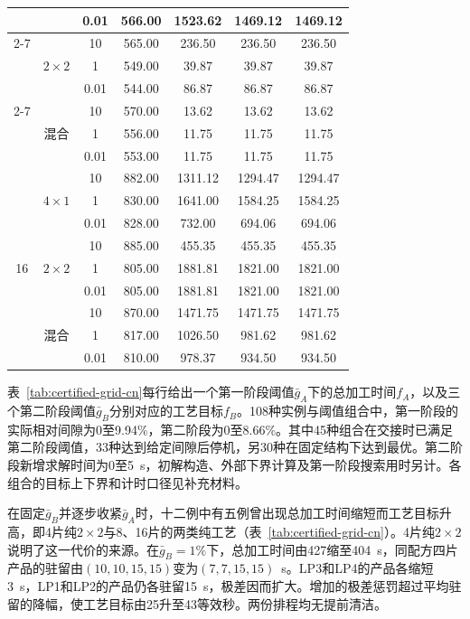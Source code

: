 \documentclass[preprint,12pt,nonatbib]{elsarticle}
\begin{document}
\begin{table}[!htbp]
\begin{tabular}{@{}ccccccc@{}}
 &  & 0.01 & 566.00 & 1523.62 & 1469.12 & 1469.12\\
\cmidrule(l){2-7}
 & \multirow{3}{*}{$2\times2$} & 10 & 565.00 & 236.50 & 236.50 & 236.50\\
 &  & 1 & 549.00 & 39.87 & 39.87 & 39.87\\
 &  & 0.01 & 544.00 & 86.87 & 86.87 & 86.87\\
\cmidrule(l){2-7}
 & \multirow{3}{*}{混合} & 10 & 570.00 & 13.62 & 13.62 & 13.62\\
 &  & 1 & 556.00 & 11.75 & 11.75 & 11.75\\
 &  & 0.01 & 553.00 & 11.75 & 11.75 & 11.75\\
\midrule
\multirow{9}{*}{16} & \multirow{3}{*}{$4\times1$} & 10 & 882.00 & 1311.12 & 1294.47 & 1294.47\\
 &  & 1 & 830.00 & 1641.00 & 1584.25 & 1584.25\\
 &  & 0.01 & 828.00 & 732.00 & 694.06 & 694.06\\
\cmidrule(l){2-7}
 & \multirow{3}{*}{$2\times2$} & 10 & 885.00 & 455.35 & 455.35 & 455.35\\
 &  & 1 & 805.00 & 1881.81 & 1821.00 & 1821.00\\
 &  & 0.01 & 805.00 & 1881.81 & 1821.00 & 1821.00\\
\cmidrule(l){2-7}
 & \multirow{3}{*}{混合} & 10 & 870.00 & 1471.75 & 1471.75 & 1471.75\\
 &  & 1 & 817.00 & 1026.50 & 981.62 & 981.62\\
 &  & 0.01 & 810.00 & 978.37 & 934.50 & 934.50\\
\bottomrule
\end{tabular}
\end{table}

表~\ref{tab:certified-grid-cn}每行给出一个第一阶段阈值$\bar g_A$下的总加工时间$f_A$，以及三个第二阶段阈值$\bar g_B$分别对应的工艺目标$f_B$。108种实例与阈值组合中，第一阶段的实际相对间隙为0至9.94\%，第二阶段为0至8.66\%。其中45种组合在交接时已满足第二阶段阈值，33种达到给定间隙后停机，另30种在固定结构下达到最优。第二阶段新增求解时间为0至5~s，初解构造、外部下界计算及第一阶段搜索用时另计。各组合的目标上下界和计时口径见补充材料。

在固定$\bar g_B$并逐步收紧$\bar g_A$时，十二例中有五例曾出现总加工时间缩短而工艺目标升高，即4片纯$2\times2$与8、16片的两类纯工艺（表~\ref{tab:certified-grid-cn}）。4片纯$2\times2$说明了这一代价的来源。在$\bar g_B=1\%$下，总加工时间由427缩至404~s，同配方四片产品的驻留由$(10,10,15,15)$变为$(7,7,15,15)$~s。LP3和LP4的产品各缩短3~s，LP1和LP2的产品仍各驻留15~s，极差因而扩大。增加的极差惩罚超过平均驻留的降幅，使工艺目标由25升至43等效秒。两份排程均无提前清洁。
\end{document}
